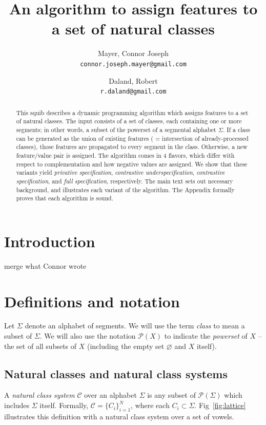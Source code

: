 \documentclass[11pt, oneside]{article}   	%
\title{An algorithm to assign features to a set of natural classes}
\author{}
\author{
  Mayer, Connor Joseph \\
  \texttt{connor.joseph.mayer@gmail.com}
  \and
  Daland, Robert \\
  \texttt{r.daland@gmail.com}
}
\begin{document}
\maketitle

\begin{abstract}
This squib describes a dynamic programming algorithm which assigns features to a set of natural classes. The input consists of a set of classes, each containing one or more segments; in other words, a subset of the powerset of a segmental alphabet $\Sigma$. If a class can be generated as the union of existing features ( = intersection of already-processed classes), those features are propagated to every segment in the class. Otherwise, a new feature/value pair is assigned. The algorithm comes in 4 flavors, which differ with respect to complementation and how negative values are assigned. We show that these variants yield \textit{privative specification}, \textit{contrastive underspecification}, \textit{contrastive specification}, and \textit{full specification}, respectively. The main text sets out necessary background, and illustrates each variant of the algorithm. The Appendix formally proves that each algorithm is sound.
\end{abstract}

\section{Introduction}
merge what Connor wrote

\section{Definitions and notation}

Let $\Sigma$ denote an alphabet of segments. We will use the term \textit{class} to mean a subset of $\Sigma$. We will also use the notation $\mathcal P(X)$ to indicate the \textit{powerset} of $X$ -- the set of all subsets of $X$ (including the empty set $\varnothing$ and $X$ itself).

\subsection{Natural classes and natural class systems}

A \textit{natural class system} $\mathcal C$ over an alphabet $\Sigma$ is any subset of $\mathcal P(\Sigma)$ which includes $\Sigma$ itself. Formally, $\mathcal C = \{ C_i \}_{i=1}^N$, where each $C_i \subset \Sigma$. Fig~\ref{fig:lattice} illustrates this definition with a natural class system over a set of vowels.
\end{document}
